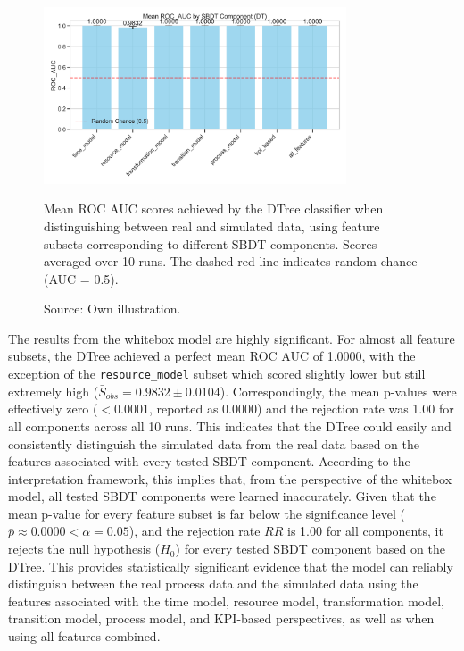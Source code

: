 \begin{figure}[htbp]
  \centering
  \includegraphics[width=0.8\textwidth]{figures/dt-roc-auc-by-component.png}
  \caption[Results Decision Tree]{Mean ROC AUC scores achieved by the DTree classifier when distinguishing between real and simulated data, using feature subsets corresponding to different SBDT components. Scores averaged over 10 runs. The dashed red line indicates random chance (AUC = 0.5).}
  \label{fig:dt-roc-auc}
  \caption*{Source: Own illustration.}
\end{figure}

The results from the whitebox model are highly significant. For almost all feature subsets, the DTree achieved a perfect mean ROC AUC of 1.0000, with the exception of the \texttt{resource\_model} subset which scored slightly lower but still extremely high ($\bar{S}_{obs}=0.9832 \pm 0.0104$). Correspondingly, the mean p-values were effectively zero ($< 0.0001$, reported as 0.0000) and the rejection rate was 1.00 for all components across all 10 runs. This indicates that the DTree could easily and consistently distinguish the simulated data from the real data based on the features associated with every tested SBDT component. According to the interpretation framework, this implies that, from the perspective of the whitebox model, all tested SBDT components were learned inaccurately.
Given that the mean p-value for every feature subset is far below the significance level ($\bar{p} \approx 0.0000 < \alpha = 0.05$), and the rejection rate $RR$ is 1.00 for all components, it rejects the null hypothesis ($H_0$) for every tested SBDT component based on the DTree. This provides statistically significant evidence that the model can reliably distinguish between the real process data and the simulated data using the features associated with the time model, resource model, transformation model, transition model, process model, and KPI-based perspectives, as well as when using all features combined.

